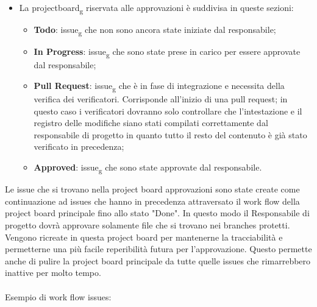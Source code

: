 \begin{itemize}
	\item La projectboard\textsubscript{g} riservata alle approvazioni è suddivisa in queste sezioni:
	\begin{itemize}
		\item \textbf{Todo}: issue\textsubscript{g} che non sono ancora state iniziate dal responsabile;
		\item \textbf{In Progress}: issue\textsubscript{g}  che sono state prese in carico per essere approvate dal responsabile;
		\item \textbf{Pull Request}: issue\textsubscript{g} che è in fase di integrazione e necessita della verifica dei verificatori. Corrisponde all'inizio di una pull request;
		in questo caso i verificatori dovranno solo controllare che l'intestazione e il registro delle modifiche siano stati compilati correttamente dal responsabile di progetto in quanto tutto il resto del contenuto è già stato verificato in precedenza;
		\item \textbf{Approved}: issue\textsubscript{g} che sono state approvate dal responsabile.
	\end{itemize}
\end{itemize}
Le issue che si trovano nella project board approvazioni sono state create come continuazione ad issues che hanno in precedenza attraversato il work flow della project board principale fino allo stato "Done".
In questo modo il Responsabile di progetto dovrà approvare solamente file che si trovano nei branches protetti.
Vengono ricreate in questa project board per  mantenerne la tracciabilità e permetterne una più facile reperibilità futura per l'approvazione.
Questo permette anche di pulire la project board principale da tutte quelle issues che rimarrebbero inattive per molto tempo.
\\\\
Esempio di work flow issues:
